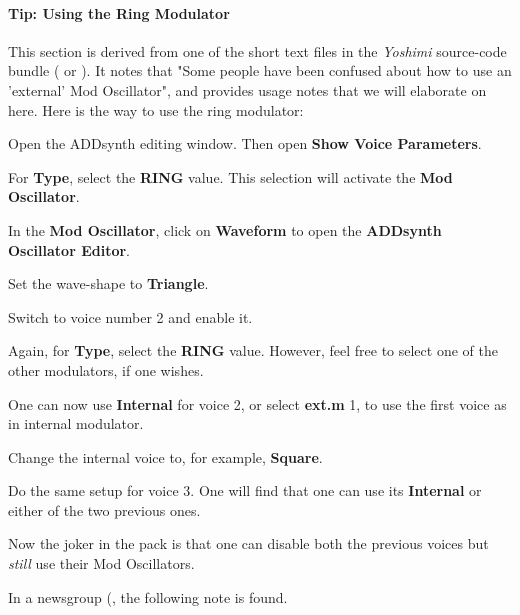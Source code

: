 \paragraph{Tip: Using the Ring Modulator}
\label{paragraph:tips_using_the_ring_modulator}

   This section is derived from one of the short text files in the
   \textsl{Yoshimi} source-code bundle (\cite{yoshimi} or \cite{yoshimi2}).
   It notes that "Some people have
   been confused about how to use an 'external' Mod Oscillator", and
   provides usage notes that we will elaborate on here.  Here is the way to
   use the ring modulator:

   \begin{enumber}
      \item Open the ADDsynth editing window.  Then open
         \textbf{Show Voice Parameters}.
      \item For \textbf{Type}, select the \textbf{RING} value.  This
         selection will activate the \textbf{Mod Oscillator}.
      \item In the \textbf{Mod Oscillator}, click on \textbf{Waveform} to open
         the \textbf{ADDsynth Oscillator Editor}.
      \item Set the wave-shape to \textbf{Triangle}.
      \item Switch to voice number 2 and enable it.
      \item Again, for \textbf{Type}, select the \textbf{RING} value.
         However, feel free to select one of the other modulators, if one
         wishes.
      \item One can now use \textbf{Internal} for voice 2, or select
         \textbf{ext.m} 1, to use the first voice as in internal modulator.
      \item Change the internal voice to, for example, \textbf{Square}.
      \item Do the same setup for voice 3.
         One will find that one can use its \textbf{Internal} or
         either of the two previous ones.
   \end{enumber}

   Now the joker in the pack is that one can disable both the previous
   voices but \textsl{still} use their Mod Oscillators.

   In a newsgroup (\cite{ringmodulator}, the following note is found.

